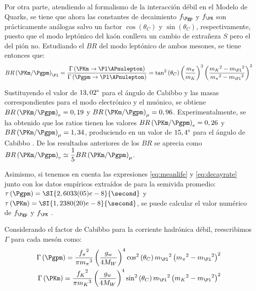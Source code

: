 Por otra parte, atendiendo al formalismo de la interacción débil en el Modelo de Quarks, se tiene que ahora las constantes de decaimiento $f_{\Pgp}$ y $f_{\PK}$ son prácticamente análogas salvo un factor $\cos \left( \theta _{C}\right)$ y $\sin \left( \theta _{C}\right)$, respectivamente, puesto que el modo leptónico del kaón conlleva un cambio de extrañeza $S$ pero el del pión no. Estudiando el $BR$ del modo leptónico de ambos mesones, se tiene entonces que:
\begin{equation}
BR\left(\PKm / \Pgpm\right)_{\Pl}=\dfrac{\Gamma \left( \PKm \rightarrow \Pl \APnulepton\right) }{\Gamma \left( \Pgpm \rightarrow \Pl \APnulepton\right)}=\tan ^{2}\left( \theta _{C}\right) \left( \dfrac{m_{\pi}}{m_{K}}\right) ^{3}\left( \dfrac{{m_{K}}^{2}-{m_{\Pl}}^{2}}{{m_{\pi}}^{2}-{m_{\Pl}}^{2}}\right) ^{2}
\end{equation}

Sustituyendo el valor de $13,02\degree$ para el ángulo de Cabibbo y las masas correspondientes para el modo electrónico y el muónico, se obtiene $BR\left(\PKm / \Pgpm\right)_{e}=0,19$ y $BR\left(\PKm / \Pgpm\right)_{\mu}=0,96$. Experimentalmente, se ha obtenido que los ratios tienen los valores $BR\left(\PKm / \Pgpm\right)_{e}=0,26$ y $BR\left(\PKm / \Pgpm\right)_{\mu}=1,34$, produciendo en un valor de  $15,4\degree$ para el ángulo de Cabibbo \cite{Griffiths2008}. De los resultados anteriores de los $BR$ se aprecia como $BR\left(\PKm / \Pgpm\right)_{e} \simeq \dfrac{1}{5} BR\left(\PKm / \Pgpm\right)_{\mu}$. 

Asimismo, si tenemos en cuenta las expresiones \ref{eq:meanlife} y \ref{eq:decayrate} junto con los datos empíricos extraídos de \cite{Zyla} para la semivida promedio: $\tau \left(\Pgpm\right)=\SI{2,6033(05)e-8}{\second}$ y $\tau \left(\PKm\right)=\SI{1,2380(20)e-8}{\second}$, se puede calcular el valor numérico de $f_{\Pgp}$ y $f_{\PK}$ \cite{Renton}. 

Considerando el factor de Cabibbo para la corriente hadrónica débil, reescribimos $\Gamma$ para cada mesón como:
\begin{align}
\Gamma\left(\Pgpm \right) =\dfrac{{f_{\pi}}^{2}}{\pi {m_{\pi}}^{3}}\left( \dfrac{g_w}{4M_W}\right)^{4} \cos^{2} \left(\theta_{C}\right)  {m_{\Pl}}^{2}\left({m_{\pi}}^{2}-{m_{\Pl}}^{2}\right)^{2}\label{eq:decayPIcab} \\
\Gamma\left(\PKm \right) =\dfrac{{f_{K}}^{2}}{\pi {m_{K}}^{3}}\left(\dfrac{g_w}{4M_W}\right)^{4} \sin^{2} \left(\theta_{C}\right) {m_{\Pl}}^{2}\left({m_{K}}^{2}-{m_{\Pl}}^{2}\right)^{2}\label{eq:decayKcab}
\end{align}

